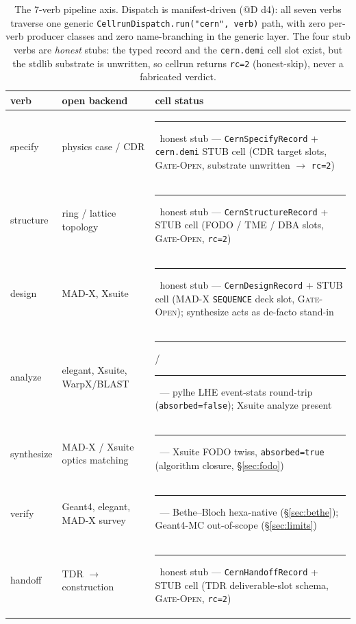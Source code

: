 \documentclass[11pt,a4paper]{article}
\newcommand{\tierdisc}[1]{\textcolor{#1}{\rule[0.05ex]{1.0ex}{1.0ex}}}
\newcommand{\tierGreen}{\tierdisc{green!60!black}}
\newcommand{\tierOrange}{\tierdisc{orange!90!black}}
\begin{document}
\begin{table}[h]
\centering
\small
\setlength{\tabcolsep}{4pt}
\begin{tabular}{@{}>{\raggedright\arraybackslash}m{1.9cm}>{\raggedright\arraybackslash}m{3.6cm}>{\raggedright\arraybackslash}m{6.4cm}@{}}
\toprule
verb & open backend & cell status \\
\midrule
specify   & physics case / CDR & \tierOrange\ honest stub --- \texttt{CernSpecifyRecord} + \texttt{cern.demi} STUB cell (CDR target slots, \textsc{Gate-Open}, substrate unwritten $\to$ \texttt{rc=2}) \\
structure & ring / lattice topology & \tierOrange\ honest stub --- \texttt{CernStructureRecord} + STUB cell (FODO / TME / DBA slots, \textsc{Gate-Open}, \texttt{rc=2}) \\
design    & MAD-X, Xsuite & \tierOrange\ honest stub --- \texttt{CernDesignRecord} + STUB cell (MAD-X \texttt{SEQUENCE} deck slot, \textsc{Gate-Open}); synthesize acts as de-facto stand-in \\
analyze   & elegant, Xsuite, WarpX/BLAST & \tierGreen/\tierOrange\ --- pylhe LHE event-stats round-trip (\texttt{absorbed=false}); Xsuite analyze present \\
synthesize& MAD-X / Xsuite optics matching & \tierGreen\ --- Xsuite FODO twiss, \texttt{absorbed=true} (algorithm closure, \S\ref{sec:fodo}) \\
verify    & Geant4, elegant, MAD-X survey & \tierGreen\ --- Bethe--Bloch hexa-native (\S\ref{sec:bethe}); Geant4-MC out-of-scope (\S\ref{sec:limits}) \\
handoff   & TDR $\to$ construction & \tierOrange\ honest stub --- \texttt{CernHandoffRecord} + STUB cell (TDR deliverable-slot schema, \textsc{Gate-Open}, \texttt{rc=2}) \\
\bottomrule
\end{tabular}
\caption{The 7-verb pipeline axis. Dispatch is manifest-driven
(@D d4): all seven verbs traverse one generic
\texttt{CellrunDispatch.run("cern", verb)} path, with zero per-verb
producer classes and zero name-branching in the generic layer. The four
stub verbs are \emph{honest} stubs: the typed record and the
\texttt{cern.demi} cell slot exist, but the stdlib substrate is
unwritten, so cellrun returns \texttt{rc=2} (honest-skip), never a
fabricated verdict.}
\label{tab:verbs}
\end{table}
\end{document}
